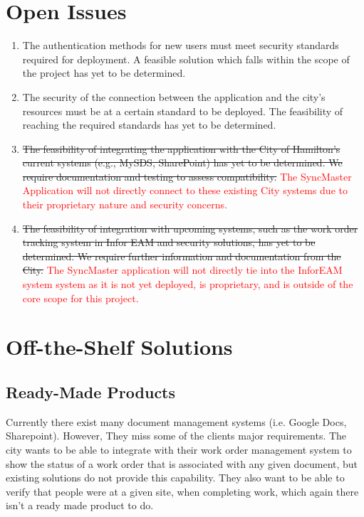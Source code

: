 \documentclass[12pt]{article}
\begin{document}
\section{Open Issues}
\begin{enumerate}
  \item The authentication methods for new users must meet security
    standards required for deployment. A feasible solution which
    falls within the scope of the project has yet to be determined.
  \item The security of the connection between the application and
    the city's resources must be at a certain standard to be
    deployed. The feasibility of reaching the required standards has
    yet to be determined.
  \item \sout{The feasibility of integrating the application with the City
      of Hamilton's current systems (e.g., MySDS, SharePoint) has yet
      to be determined. We require documentation and testing to assess
    compatibility.} \textcolor{red}{The SyncMaster Application will
      not directly connect to these existing
    City systems due to their proprietary nature and security concerns.}
  \item \sout{The feasibility of integration with upcoming systems, such as
      the work order tracking system in Infor EAM and security
      solutions, has yet to be determined. We require further
    information and documentation from the City.} \textcolor{red}{The
      SyncMaster application will not directly tie into the InforEAM system
      system as it is not yet deployed, is proprietary, and is outside
    of the core scope for this project.}
\end{enumerate}

\section{Off-the-Shelf Solutions}
\subsection{Ready-Made Products}
Currently there exist many document management systems (i.e. Google Docs,
Sharepoint). However, They miss some of the clients major requirements. The
city wants to be able to integrate with their work order management system to
show the status of a work order that is associated with any given document,
but existing solutions do not provide this capability. They also want to be
able to verify that people were at a given site, when completing work, which
again there isn't a ready made product to do.
\end{document}
